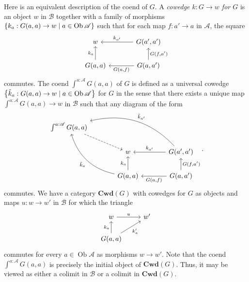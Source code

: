 \documentclass[10pt,letterpaper,cm]{nupset}
\theoremstyle{definition}
\theoremstyle{theorem}
\theoremstyle{remark}
\DeclareMathOperator{\ob}{Ob}
\newcommand{\0}{\mathbf{0}}
\newcommand{\1}{\mathbf{1}}
\newcommand{\2}{\mathbf{2}}
\renewcommand{\a}{\mathscr{A}}
\renewcommand{\b}{\mathscr{B}}
\begin{document}
Here is an equivalent description of the coend of $G$. A \textit{cowedge $k: G \to w$ for $G$} is an object $w$ in $\b$ together with a family of morphisms $\mleft\{k_a : G(a,a) \to w \mid a\in \ob{\a}\mright\}$ such that for each map $f:a' \to a$ in $\a$, the square
\[
\begin{tikzcd}[column sep = large]
w                         & {G\mleft(a',a'\mright)} \arrow[l, "k_{a'}"']                         \\
{G(a,a)} \arrow[u, "k_a"] & {G(a,a')} \arrow[l, "{G(a,f)}"] \arrow[u, "{G(f,a')}"']
\end{tikzcd}
\] commutes. The coend $\int^{a:\a}G(a,a)$ of $G$ is defined as a universal cowedge $\mleft\{\tilde{k}_a : G(a,a) \to w \mid a\in \ob{\a}\mright\}$ for $G$ in the sense that there exists a unique map $ \int^{a:\a}G(a,a) \to w$ in $\b$ such that any diagram of the form
\[
\begin{tikzcd}[column sep=large]
{\int^{a:\a}G(a,a)} \arrow[rd, dashed] &                                                                 &                                                                            \\
                                       & w                                                               & {G\mleft(a',a'\mright)} \arrow[l, "k_{a'}"'] \arrow[llu, "\tilde{k}_{a'}"', bend right] \\
                                       & {G(a,a)} \arrow[u, "k_a"] \arrow[luu, "\tilde{k}_a", bend left] & {G(a,a')} \arrow[u, "{G(f,a')}"'] \arrow[l, "{G(a,f)}"]                                  
\end{tikzcd}.
\]
commutes.
We have a category $\mathbf{Cwd}(G)$ with cowedges for $G$ as objects and maps $u: w \to w'$ in $\b$ for which the triangle
\[
\begin{tikzcd}
w \arrow[r, "u"]                              & w' \\
{G(a,a)} \arrow[u, "k_a"] \arrow[ru, "k'_a"'] &   
\end{tikzcd}
\] commutes for every $a\in \ob{\a}$ as morphisms $w\to w'$. Note that the coend $\int^{a:\a}G(a,a)$ is precisely the initial object of $\mathbf{Cwd}(G)$. Thus, it may be viewed as either a colimit in $\b$ or a colimit in $\mathbf{Cwd}(G)$.
\end{document}
